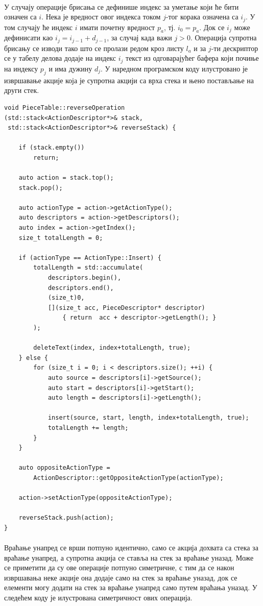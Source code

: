 \documentclass[12pt,oneside]{memoir}
\begin{document}
\paragraph{}
У случају операције брисања се дефинише индекс за уметање који ће бити означен са \(i\). Нека је вредност овог индекса током \(j\)-тог корака означена са
\(i_j\). У том случају ће индекс \(i\) имати почетну вредност \(p_a\), тј. \(i_0 = p_a\). Док се \(i_j\) може дефинисати као \(i_j = i_{j-1} + d_{j-1}\),
за случај када важи \(j > 0\). Операција супротна брисању се изводи тако што се пролази редом кроз листу \(l_a\) и за \(j\)-ти дескриптор се у табелу делова додаје на индекс \(i_j\) текст из одговарајућег бафера који почиње на индексу \(p_j\) и има дужину \(d_j\). У наредном програмском коду илустровано је
извршавање акције која је супротна акцији са врха стека и њено постављање на
други стек.

\begin{verbatim}
void PieceTable::reverseOperation
(std::stack<ActionDescriptor*>& stack, 
 std::stack<ActionDescriptor*>& reverseStack) {
	
	if (stack.empty())
		return;
	
	auto action = stack.top();
	stack.pop();
	
	auto actionType = action->getActionType();
	auto descriptors = action->getDescriptors();
	auto index = action->getIndex();
	size_t totalLength = 0;
	
	if (actionType == ActionType::Insert) {
		totalLength = std::accumulate(
			descriptors.begin(), 
			descriptors.end(), 
			(size_t)0,
			[](size_t acc, PieceDescriptor* descriptor) 
				{ return  acc + descriptor->getLength(); }
		);
		
		deleteText(index, index+totalLength, true);
	} else {
		for (size_t i = 0; i < descriptors.size(); ++i) {
			auto source = descriptors[i]->getSource();
			auto start = descriptors[i]->getStart();
			auto length = descriptors[i]->getLength();
			
			insert(source, start, length, index+totalLength, true);
			totalLength += length;
		}
	}
	
	auto oppositeActionType = 
		ActionDescriptor::getOppositeActionType(actionType);
		
	action->setActionType(oppositeActionType);
	
	reverseStack.push(action);
}
\end{verbatim}

\paragraph{}
Враћање унапред се врши потпуно идентично, само се акција дохвата
са стека за враћање унапред, а супротна акција се ставља на стек за враћање
уназад. Може се приметити да су ове операције потпуно симетричне, с тим да се након 
извршавања неке акције она додаје само на стек за враћање уназад, док се елементи могу додати на стек за враћање унапред само путем враћања уназад. У следећем
коду је илустрована симетричност ових операција.
\end{document}
